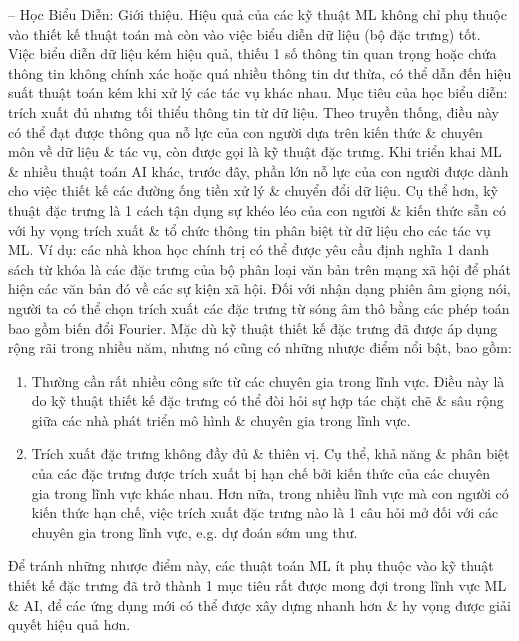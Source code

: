 \documentclass{article}
\begin{document}
\begin{itemize}
\begin{itemize}
        -- {\sf Học Biểu Diễn: Giới thiệu.} Hiệu quả của các kỹ thuật ML không chỉ phụ thuộc vào thiết kế thuật toán mà còn vào việc biểu diễn dữ liệu (bộ đặc trưng) tốt. Việc biểu diễn dữ liệu kém hiệu quả, thiếu 1 số thông tin quan trọng hoặc chứa thông tin không chính xác hoặc quá nhiều thông tin dư thừa, có thể dẫn đến hiệu suất thuật toán kém khi xử lý các tác vụ khác nhau. Mục tiêu của học biểu diễn: trích xuất đủ nhưng tối thiểu thông tin từ dữ liệu. Theo truyền thống, điều này có thể đạt được thông qua nỗ lực của con người dựa trên kiến thức \& chuyên môn về dữ liệu \& tác vụ, còn được gọi là kỹ thuật đặc trưng. Khi triển khai ML \& nhiều thuật toán AI khác, trước đây, phần lớn nỗ lực của con người được dành cho việc thiết kế các đường ống tiền xử lý \& chuyển đổi dữ liệu. Cụ thể hơn, kỹ thuật đặc trưng là 1 cách tận dụng sự khéo léo của con người \& kiến thức sẵn có với hy vọng trích xuất \& tổ chức thông tin phân biệt từ dữ liệu cho các tác vụ ML. Ví dụ: các nhà khoa học chính trị có thể được yêu cầu định nghĩa 1 danh sách từ khóa là các đặc trưng của bộ phân loại văn bản trên mạng xã hội để phát hiện các văn bản đó về các sự kiện xã hội. Đối với nhận dạng phiên âm giọng nói, người ta có thể chọn trích xuất các đặc trưng từ sóng âm thô bằng các phép toán bao gồm biến đổi Fourier. Mặc dù kỹ thuật thiết kế đặc trưng đã được áp dụng rộng rãi trong nhiều năm, nhưng nó cũng có những nhược điểm nổi bật, bao gồm:
        \begin{enumerate}
            \item Thường cần rất nhiều công sức từ các chuyên gia trong lĩnh vực. Điều này là do kỹ thuật thiết kế đặc trưng có thể đòi hỏi sự hợp tác chặt chẽ \& sâu rộng giữa các nhà phát triển mô hình \& chuyên gia trong lĩnh vực.
            \item Trích xuất đặc trưng không đầy đủ \& thiên vị. Cụ thể, khả năng \& phân biệt của các đặc trưng được trích xuất bị hạn chế bởi kiến thức của các chuyên gia trong lĩnh vực khác nhau. Hơn nữa, trong nhiều lĩnh vực mà con người có kiến thức hạn chế, việc trích xuất đặc trưng nào là 1 câu hỏi mở đối với các chuyên gia trong lĩnh vực, e.g. dự đoán sớm ung thư.
        \end{enumerate}
        Để tránh những nhược điểm này, các thuật toán ML ít phụ thuộc vào kỹ thuật thiết kế đặc trưng đã trở thành 1 mục tiêu rất được mong đợi trong lĩnh vực ML \& AI, để các ứng dụng mới có thể được xây dựng nhanh hơn \& hy vọng được giải quyết hiệu quả hơn.


\end{itemize}
\end{itemize}
\end{document}
